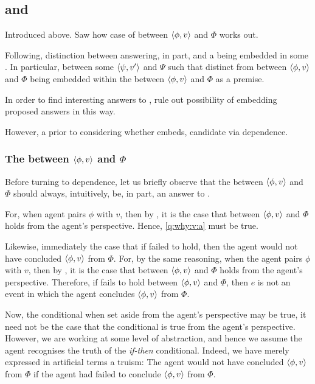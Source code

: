 \subsection{\qWhyVnP{} and \qWhyV{}}
\label{cha:clar:expand:qWhy:variant}

\begin{note}
  Introduced \qWhyVnP{} above.
  Saw how case of \ros{} between \(\langle \phi, v \rangle\) and \(\Phi\) works out.

  Following, distinction between \ros{} answering, in part, \qWhyVnP{} and a \ros{} being embedded in some \ros{}.
  In particular, \ros{} between some \(\langle \psi, v' \rangle\) and \(\Psi\) such that distinct from \ros{} between \(\langle \phi, v \rangle\) and \(\Phi\) being embedded within the \ros{} between \(\langle \phi, v \rangle\) and \(\Phi\) as a premise.

  In order to find interesting answers to \qWhyVnP{}, rule out possibility of embedding proposed answers in this way.

  However, a prior to considering whether embeds, candidate  via dependence.
\end{note}

\subsubsection{The \ros{} between \(\langle \phi, v \rangle\) and \(\Phi\)}

\begin{note}
  Before turning to dependence, let us briefly observe that the \ros{} between \(\langle \phi, v \rangle\) and \(\Phi\) should always, intuitively, be, in part, an answer to \qWhyV{}.

  For, when agent pairs \(\phi\) with \(v\), then by \supportI{}, it is the case that \ros{} between \(\langle \phi, v \rangle\) and \(\Phi\) holds from the agent's perspective.
  Hence, \ref{q:why:v:a} must be true.

  Likewise, immediately the case that if \support{} failed to hold, then the agent would not have concluded \(\langle \phi, v \rangle\) from \(\Phi\).
  For, by the same reasoning, when the agent pairs \(\phi\) with \(v\), then by \supportI{}, it is the case that \ros{} between \(\langle \phi, v \rangle\) and \(\Phi\) holds from the agent's perspective.
  Therefore, if \support{} fails to hold between \(\langle \phi, v \rangle\) and \(\Phi\), then \(e\) is not an event in which the agent concludes \(\langle \phi, v \rangle\) from \(\Phi\).

  Now, the conditional when set aside from the agent's perspective may be true, it need not be the case that the conditional is true from the agent's perspective.
  However, we are working at some level of abstraction, and hence we assume the agent recognises the truth of the \emph{if-then} conditional.
  Indeed, we have merely expressed in artificial terms a truism:
  The agent would not have concluded \(\langle \phi, v \rangle\) from \(\Phi\) if the agent had failed to conclude \(\langle \phi, v \rangle\) from \(\Phi\).
\end{note}


